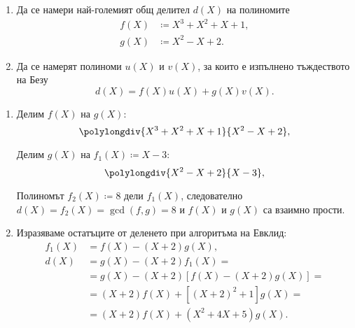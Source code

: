 \documentclass{../../common/topic}
\begin{document}
\begin{problem}
  \hfill
  \begin{enumerate}
    \item Да се намери най-големият общ делител \( d(X) \) на полиномите
    \begin{align*}
      f(X) &\coloneqq X^3 + X^2 + X + 1, \\
      g(X) &\coloneqq X^2 - X + 2.
    \end{align*}

    \item Да се намерят полиноми \( u(X) \) и \( v(X) \), за които е изпълнено тъждеството на Безу
    \begin{equation*}
      d(X) = f(X) u(X) + g(X) v(X).
    \end{equation*}
  \end{enumerate}
\end{problem}
\begin{solution}
  \hfill
  \begin{enumerate}
    \item Делим \( f(X) \) на \( g(X) \):
    \begin{displaymath}
      \polylongdiv {X^3 + X^2 + X + 1} {X^2 - X + 2},
    \end{displaymath}

    Делим \( g(X) \) на \( f_1(X) \coloneqq X - 3 \):
    \begin{displaymath}
      \polylongdiv {X^2 - X + 2} {X - 3},
    \end{displaymath}

    Полиномът \( f_2(X) \coloneqq 8 \) дели \( f_1(X) \), следователно \( d(X) = f_2(X) = \gcd(f, g) = 8 \) и \( f(X) \) и \( g(X) \) са взаимно прости.

    \item Изразяваме остатъците от деленето при алгоритъма на Евклид:
    \begin{align*}
      f_1(X)
      &=
      f(X) - (X + 2) g(X),
      \\
      d(X)
      &=
      g(X) - (X + 2) f_1(X)
      = \\ &=
      g(X) - (X + 2) [f(X) - (X + 2) g(X)]
      = \\ &=
      (X + 2) f(X) + [{(X + 2)}^2 + 1] g(X)
      = \\ &=
      \boxed{(X + 2) f(X) + (X^2 + 4X + 5) g(X)}.
    \end{align*}
  \end{enumerate}
\end{solution}
\end{document}

